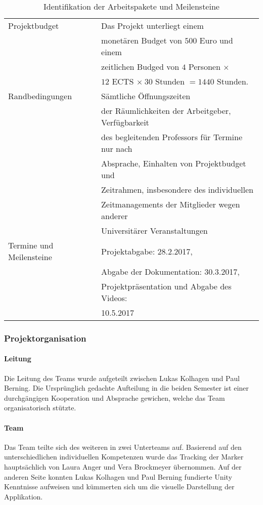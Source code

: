 \begin{table}
\begin{tabularx}{\textwidth}{|l|l|}
\hline
	Projektbudget & Das Projekt unterliegt einem\\
	& monetären Budget von $500$ Euro und einem\\
	& zeitlichen Budged von $4$ Personen $\times$ \\
	&$12$ ECTS $\times \ 30$ Stunden $ = 1440$ Stunden.\\
	\hline
	Randbedingungen & Sämtliche Öffnungszeiten\\
	& der Räumlichkeiten der Arbeitgeber, Verfügbarkeit\\
	& des begleitenden Professors für Termine nur nach \\
	&Absprache, Einhalten von Projektbudget und \\
	&Zeitrahmen, insbesondere des individuellen \\
	&Zeitmanagements der Mitglieder wegen anderer\\
	& Universitärer Veranstaltungen\\
	\hline
	Termine und Meilensteine & Projektabgabe: 28.2.2017, \\
	&Abgabe der Dokumentation: 30.3.2017, \\
	&Projektpräsentation und Abgabe des Videos: \\
	&10.5.2017\\
	\hline

	\end{tabularx}
	\caption{Identifikation der Arbeitspakete und Meilensteine}
	\label{tab:Projektformular}
\end{table}

\subsubsection{Projektorganisation}
\paragraph{Leitung} Die Leitung des Teams wurde aufgeteilt zwischen Lukas Kolhagen und Paul Berning. Die Ursprünglich gedachte Aufteilung in die beiden Semester ist einer durchgängigen Kooperation und Absprache gewichen, welche das Team organisatorisch stützte.
\paragraph{Team} Das Team teilte sich des weiteren in zwei Unterteams auf. Basierend auf den unterschiedlichen individuellen Kompetenzen wurde das Tracking der Marker hauptsächlich von Laura Anger und Vera Brockmeyer übernommen. Auf der anderen Seite konnten Lukas Kolhagen und Paul Berning fundierte Unity Kenntnisse aufweisen und kümmerten sich um die visuelle Darstellung der Applikation.

